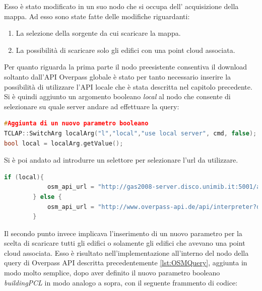 Esso è stato modificato in un suo nodo che si occupa dell' acquisizione della mappa. Ad esso sono state fatte delle modifiche riguardanti:
\begin{enumerate}
    \item La selezione della sorgente da cui scaricare la mappa.
    \item La possibilità di scaricare solo gli edifici con una point cloud associata.
\end{enumerate}{}

Per quanto riguarda la prima parte il nodo preesistente consentiva il download soltanto dall'API Overpass globale è stato per tanto necessario inserire la possibilità di utilizzare l'API locale che è stata descritta nel capitolo precedente.\\
Si è quindi aggiunto un argomento booleano \textit{local} al nodo che consente di selezionare su quale server andare ad effettuare la query:

\begin{lstlisting}[caption={Aggiunta del parametro per il download dal server in locale},captionpos=b,language=cpp]
#Aggiunta di un nuovo parametro booleano
TCLAP::SwitchArg localArg("l","local","use local server", cmd, false);
bool local = localArg.getValue();
\end{lstlisting}

Si è poi andato ad introdurre un selettore per selezionare l'url da utilizzare.

\begin{lstlisting}[caption={Selezione del server da utilizzare per la query},captionpos=b,language=cpp]
 if (local){
            osm_api_url = "http://gas2008-server.disco.unimib.it:5001/api/interpreter?data=(" + highwaysQuery + buildingQuery + paramQuery + ");(._;>;);out%20meta;";
        } else {
            osm_api_url = "http://www.overpass-api.de/api/interpreter?data=(" + highwaysQuery + buildingQuery + paramQuery + ");(._;>;);out%20meta;";
        }
\end{lstlisting}

Il secondo punto invece implicava l'inserimento di un nuovo parametro per la scelta di scaricare tutti gli edifici o solamente gli edifici che avevano una point cloud associata. Esso è risultato nell'implementazione all'interno del nodo della query di Overpass API descritta precedentemente \ref{lst:OSMQuery}, aggiunta in modo molto semplice, dopo aver definito il nuovo parametro booleano \textit{buildingPCL} in modo analogo a sopra, con il seguente frammento di codice:

